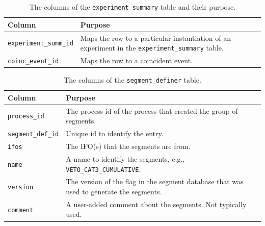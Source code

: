 \begin{table}[p]
\label{tab:experiment_map}
\center
\begin{tabular}{ l | p{10cm}}
Column      &   Purpose     \\
\hline \hline
\texttt{experiment\_summ\_id}   &   Maps the row to a particular instantiation of an experiment in the \texttt{experiment\_summary} table. \\
\hline
\texttt{coinc\_event\_id}   &   Maps the row to a coincident event.
\end{tabular}
\caption{The columns of the \texttt{experiment\_summary} table and their purpose.}
\end{table}

\pagebreak

\begin{table}[p]
\label{tab:segment_definer}
\center
\begin{tabular}{ l | p{10cm}}
Column      &   Purpose     \\
\hline \hline
\texttt{process\_id}    &   The process id of the process that created the group of segments. \\
\hline
\texttt{segment\_def\_id}   &   Unique id to identify the entry. \\
\hline
\texttt{ifos}   &   The \ac{IFO}(s) that the segments are from. \\
\hline
\texttt{name}   &   A name to identify the segments, e.g., \texttt{VETO\_CAT3\_CUMULATIVE}. \\
\hline
\texttt{version}    &   The version of the flag in the segment database that was used to generate the segments. \\
\hline
\texttt{comment}    &   A user-added comment about the segments. Not typically used.
\end{tabular}
\caption{The columns of the \texttt{segment\_definer} table.}
\end{table}

